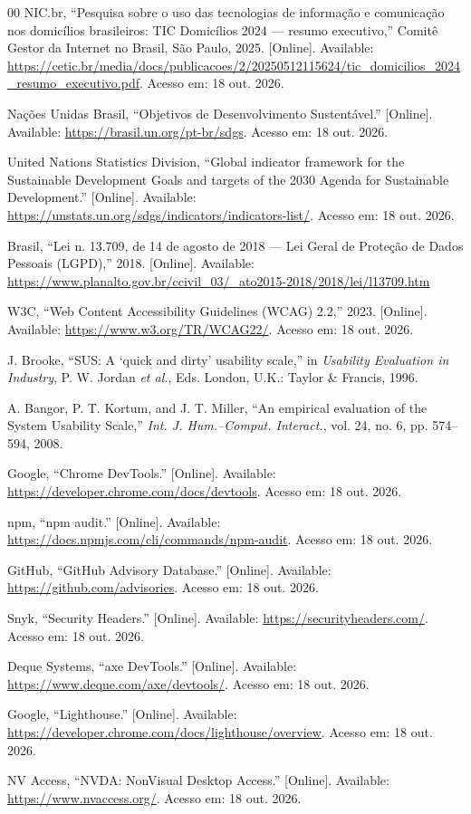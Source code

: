 \documentclass[conference]{IEEEtran}
\begin{document}
\begin{thebibliography}{00}
 NIC.br, ``Pesquisa sobre o uso das tecnologias de
informação e comunicação nos domicílios brasileiros: TIC Domicílios 2024 ---
resumo executivo,'' Comitê Gestor da Internet no Brasil, São Paulo, 2025.
[Online]. Available:
\url{https://cetic.br/media/docs/publicacoes/2/20250512115624/tic_domicilios_2024_resumo_executivo.pdf}.
Acesso em: 18 out. 2026.

 Nações Unidas Brasil, ``Objetivos de Desenvolvimento
Sustentável.'' [Online]. Available: \url{https://brasil.un.org/pt-br/sdgs}.
Acesso em: 18 out. 2026.

 United Nations Statistics Division, ``Global indicator framework
for the Sustainable Development Goals and targets of the 2030 Agenda for
Sustainable Development.'' [Online]. Available:
\url{https://unstats.un.org/sdgs/indicators/indicators-list/}. Acesso em:
18 out. 2026.

 Brasil, ``Lei n. 13.709, de 14 de agosto de 2018 --- Lei Geral
de Proteção de Dados Pessoais (LGPD),'' 2018. [Online]. Available:
\url{https://www.planalto.gov.br/ccivil_03/_ato2015-2018/2018/lei/l13709.htm}

 W3C, ``Web Content Accessibility Guidelines (WCAG) 2.2,''
2023. [Online]. Available: \url{https://www.w3.org/TR/WCAG22/}. Acesso em:
18 out. 2026.

 J. Brooke, ``SUS: A `quick and dirty' usability scale,'' in
\textit{Usability Evaluation in Industry}, P. W. Jordan \textit{et al.}, Eds.
London, U.K.: Taylor \& Francis, 1996.

 A. Bangor, P. T. Kortum, and J. T. Miller, ``An empirical
evaluation of the System Usability Scale,'' \textit{Int. J. Hum.--Comput.
Interact.}, vol. 24, no. 6, pp. 574--594, 2008.

 Google, ``Chrome DevTools.'' [Online]. Available:
\url{https://developer.chrome.com/docs/devtools}. Acesso em: 18 out. 2026.

 npm, ``npm audit.'' [Online]. Available:
\url{https://docs.npmjs.com/cli/commands/npm-audit}. Acesso em: 18 out. 2026.

 GitHub, ``GitHub Advisory Database.'' [Online].
Available: \url{https://github.com/advisories}. Acesso em: 18 out. 2026.

 Snyk, ``Security Headers.'' [Online]. Available:
\url{https://securityheaders.com/}. Acesso em: 18 out. 2026.

 Deque Systems, ``axe DevTools.'' [Online]. Available:
\url{https://www.deque.com/axe/devtools/}. Acesso em: 18 out. 2026.

 Google, ``Lighthouse.'' [Online]. Available:
\url{https://developer.chrome.com/docs/lighthouse/overview}. Acesso em:
18 out. 2026.

 NV Access, ``NVDA: NonVisual Desktop Access.'' [Online].
Available: \url{https://www.nvaccess.org/}. Acesso em: 18 out. 2026.
\end{thebibliography}
\end{document}
